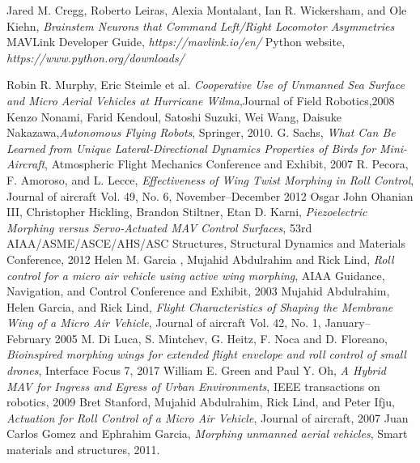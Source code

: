 \documentclass[12pt,a4paper]{article}
\begin{document}
\begin{thebibliography}{100}
	
	Jared M. Cregg, Roberto Leiras, Alexia Montalant, Ian R. Wickersham, and Ole Kiehn, \textit{Brainstem Neurons that Command Left/Right Locomotor Asymmetries} 
	 MAVLink Developer Guide, \textit{https://mavlink.io/en/}
	 Python website, \textit{https://www.python.org/downloads/}
	
	 Robin R. Murphy, Eric Steimle et al. \textit{Cooperative Use of Unmanned Sea Surface and Micro Aerial Vehicles at Hurricane Wilma},Journal of Field Robotics,2008
	     Kenzo Nonami, Farid Kendoul, Satoshi Suzuki, Wei Wang, Daisuke Nakazawa,\textit{Autonomous Flying Robots}, Springer, 2010.
	 G. Sachs, \textit{What Can Be Learned from Unique Lateral-Directional Dynamics Properties of Birds for Mini-Aircraft}, Atmospheric Flight Mechanics Conference and Exhibit, 2007
	 R. Pecora, F. Amoroso, and L. Lecce, \textit{Effectiveness of Wing Twist Morphing in Roll Control}, Journal of aircraft Vol. 49, No. 6, November–December 2012
	 Osgar John Ohanian III, Christopher Hickling, Brandon Stiltner, Etan D. Karni, \textit{Piezoelectric Morphing versus Servo-Actuated MAV Control Surfaces}, 53rd AIAA/ASME/ASCE/AHS/ASC Structures, Structural Dynamics and Materials Conference, 2012
	 Helen M. Garcia , Mujahid Abdulrahim and Rick Lind, \textit{Roll control for a micro air vehicle using active wing morphing}, AIAA Guidance, Navigation, and Control Conference and Exhibit, 2003
	 Mujahid Abdulrahim, Helen Garcia, and Rick Lind, \textit{Flight Characteristics of Shaping the Membrane Wing of a Micro Air Vehicle}, Journal of aircraft Vol. 42, No. 1, January–February 2005
	 M. Di Luca, S. Mintchev, G. Heitz, F. Noca and D. Floreano, \textit{Bioinspired morphing wings for extended flight envelope and roll control of small drones}, Interface Focus 7, 2017
	 William E. Green and Paul Y. Oh, \textit{A Hybrid MAV for Ingress and Egress of Urban Environments}, IEEE transactions on robotics, 2009
	 Bret Stanford, Mujahid Abdulrahim, Rick Lind, and Peter Ifju, \textit{Actuation for Roll Control of a Micro Air Vehicle}, Journal of aircraft,  2007
	 Juan Carlos Gomez and Ephrahim Garcia, \textit{Morphing unmanned aerial vehicles}, Smart materials and structures, 2011.

\end{thebibliography}
\end{document}
